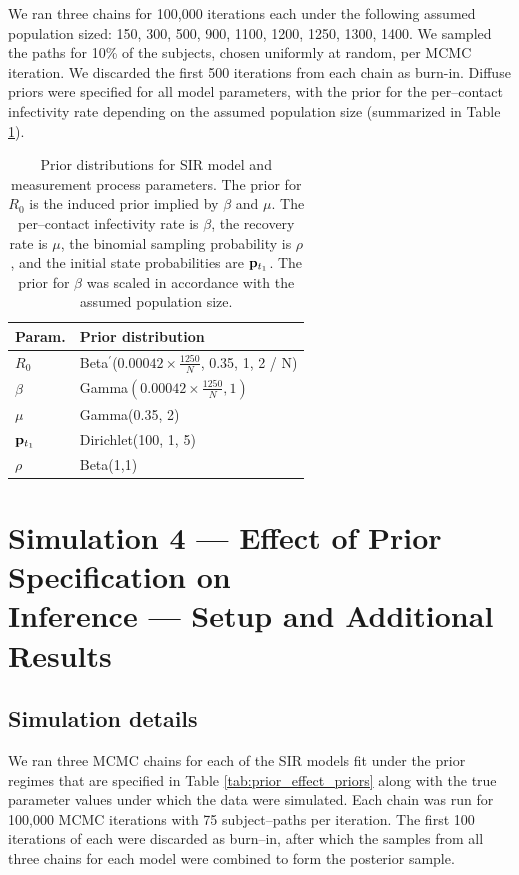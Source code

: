 We ran three chains for 100,000 iterations each under the following assumed population sized: 150, 300, 500, 900, 1100, 1200, 1250, 1300, 1400. We sampled the paths for 10\% of the subjects, chosen uniformly at random, per MCMC iteration. We discarded the first 500 iterations from each chain as burn-in. Diffuse priors were specified for all model parameters, with the prior for the per--contact infectivity rate depending on the assumed population size (summarized in Table \ref{tab:popsize_misspec_priors}).

\begin{table}[htbp]
	\centering
	\begin{tabular}{ll}
		\hline
		Param. & Prior distribution \\ 
		\hline
		$ R_0 $ &  Beta$ ^\prime $($ 0.00042 \times \frac{1250}{N} $, 0.35, 1, 2 / N) \\
		$ \beta $ &  Gamma$ (0.00042 \times \frac{1250}{N}, 1) $ \\ 
		$ \mu $ & Gamma(0.35, 2)  \\ 
		$ \mathbf{p}_{t_1} $ & Dirichlet(100, 1, 5)  \\ 
		$ \rho $ & Beta(1,1) \\
		\hline
	\end{tabular}
	\caption[Simulation 3 SIR model priors.]{Prior distributions for SIR model and measurement process parameters. The prior for $ R_0 $ is the induced prior implied by $ \beta $ and $ \mu $. The per--contact infectivity rate is $ \beta $, the recovery rate is $ \mu $, the binomial sampling probability is $ \rho $, and the initial state probabilities are $ \mathbf{p}_{t_1} $. The prior for $ \beta $ was scaled in accordance with the assumed population size.}
	\label{tab:popsize_misspec_priors}
\end{table}

\newpage

\section{Simulation 4 --- Effect of Prior Specification on\\ Inference --- Setup and Additional Results}
\label{sec:prior_effect_details}
\subsection{Simulation details}
We ran three MCMC chains for each of the SIR models fit under the prior regimes that are specified in Table \ref{tab:prior_effect_priors} along with the true parameter values under which the data were simulated. Each chain was run for 100,000 MCMC iterations  with 75 subject--paths per iteration. The first 100 iterations of each were discarded as burn--in, after which the samples from all three chains for each model were combined to form the posterior sample.

